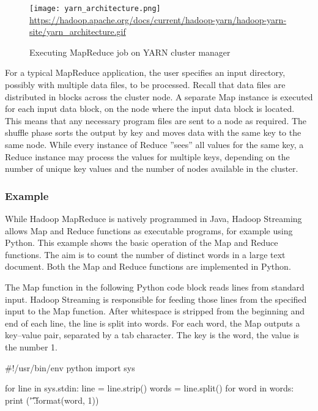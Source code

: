 \begin{figure}
\centering
\texttt{[image: yarn\_architecture.png]}\\

\scriptsize\url{https://hadoop.apache.org/docs/current/hadoop-yarn/hadoop-yarn-site/yarn_architecture.gif}\normalsize
\caption{Executing MapReduce job on YARN cluster manager}
\label{fig:yarnhadoop}
\end{figure}

For a typical MapReduce application, the user specifies an input directory, possibly with multiple data files, to be processed. Recall that data files are distributed in blocks across the cluster node. A separate Map instance is executed for each input data block, on the node where the input data block is located. This means that any necessary program files are sent to a node as required. The shuffle phase sorts the output by key and moves data with the same key to the same node. While every instance of Reduce ''sees'' all values for the same key, a Reduce instance may process the values for multiple keys, depending on the number of unique key values and the number of nodes available in the cluster. 

\subsubsection*{Example}

While Hadoop MapReduce is natively programmed in Java, Hadoop Streaming allows Map and Reduce functions as executable programs, for example using Python. This example shows the basic operation of the Map and Reduce functions. The aim is to count the number of distinct words in a large text document. Both the Map and Reduce functions are implemented in Python. 

The Map function in the following Python code block reads lines from standard input. Hadoop Streaming is responsible for feeding those lines from the specified input to the Map function. After whitespace is stripped from the beginning and end of each line, the line is split into words. For each word, the Map outputs a key--value pair, separated by a tab character. The key is the word, the value is the number 1.

\begin{samepage}
\begin{pythoncode}
#!/usr/bin/env python
import sys

for line in sys.stdin:
    line = line.strip()
    words = line.split()
    for word in words:
        print ('{}\t{}'.format(word, 1))
\end{pythoncode}
\end{samepage}

